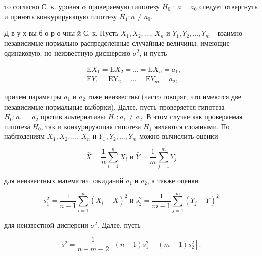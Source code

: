 \documentclass[10pt]{article}
\begin{document}
то согласно С. к. уровня $\alpha$ проверяемую гишотезу $H_{0}$ : $a=a_{0}$ следует отвергнуть и принять конкурирующую гипотезу $H_{1}: a \neq a_{0}$.



Д в у х вы б о р о чны й С. к. Пусть $X_{1}, X_{2}, \ldots$, $X_{n}$ и $Y_{1}, Y_{2}, \ldots, Y_{m}$ - взаимно независимые нормально распределенные случайные величины, имеющие одинаковую, но неизвестную дисшерсию $\sigma^{2}$, и пусть



\[

\begin{aligned}

& \mathrm{E} X_{1}=\mathrm{E} X_{2}=\ldots=\mathrm{E} X_{n}=a_{1}, \\

& \mathrm{E} Y_{1}=\mathrm{EY}_{2}=\ldots=\mathrm{E} Y_{m}=a_{2},

\end{aligned}

\]



причем параметры $a_{1}$ и $a_{2}$ тоже неизвестны (часто говорят, что имеются две независимые нормальные выборки). Далее, пусть проверяется гипотеза $H_{0}: a_{1}=a_{2}$ против альтернативы $H_{1}: a_{1} \neq a_{2}$. В этом случае как проверяемая гипотеза $H_{0}$, так и конкурирующая гипотеза $H_{1}$ являются сложными. По наблюдениям $X_{1}, X_{2}, \ldots$, $X_{n}$ и $Y_{1}, Y_{2}, \ldots, Y_{m}$ можно вычислить оценки



\[

\bar{X}=\frac{1}{n} \sum_{i=1}^{n} X_{i} \text { и } \bar{Y}=\frac{1}{m} \sum_{j=1}^{m} Y_{j}

\]



для неизвестных математич. ожиданий $a_{1}$ и $a_{2}$, а также оценки



\[

s_{1}^{2}=\frac{1}{n-1} \sum_{i=1}^{n}\left(X_{i}-\bar{X}\right)^{2} \text { и } s_{2}^{2}=\frac{1}{m-1} \sum_{j=1}^{m}\left(Y_{j}-\bar{Y}\right)^{2}

\]



для неизвестной дисперсии $\sigma^{2}$. Далее, пусть



\[

s^{2}=\frac{1}{n+m-2}\left[(n-1) s_{1}^{2}+(m-1) s_{2}^{2}\right] .

\]
\end{document}
